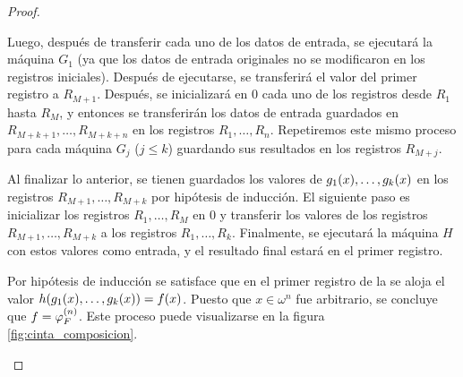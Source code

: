 \begin{proof}
\begin{itemize}
\begin{itemize}
	Luego, después de transferir cada uno de los datos de entrada, se ejecutará la máquina $G_{1}$ (ya que los datos de entrada originales no se modificaron en los registros iniciales). Después de ejecutarse, se transferirá el valor del primer registro a $R_{M + 1}$.
	Después, se inicializará en $0$ cada uno de los registros desde $R_{1}$ hasta $R_{M}$, y entonces se transferirán los datos de entrada guardados en $R_{M + k + 1},\dotsc, R_{M + k + n}$ en los registros $R_{1},\dotsc, R_{n}$. Repetiremos este mismo proceso para cada máquina $G_{j}$ ($j\leq k$) guardando sus resultados en los registros $R_{M + j}$.

	Al finalizar lo anterior, se tienen guardados los valores de $g_{1}\pa*{x},\dotsc, g_{k}\pa*{x}$ en los registros $R_{M + 1},\dotsc, R_{M + k}$ por hipótesis de inducción. El siguiente paso es inicializar los registros $R_{1},\dotsc, R_{M}$ en $0$ y transferir los valores de los registros $R_{M + 1},\dotsc, R_{M + k}$ a los registros $R_{1},\dotsc, R_{k}$. Finalmente, se ejecutará la máquina $H$ con estos valores como entrada, y el resultado final estará en el primer registro.

	Por hipótesis de inducción se satisface que en el primer registro de la se aloja el valor $h\pa*{g_{1}\pa*{x},\dotsc, g_{k}\pa*{x}} = f\pa*{x}$. Puesto que $x\in\omega^{n}$ fue arbitrario, se concluye que $f =\PHI{F}[n]$. Este proceso puede visualizarse en la figura \ref{fig:cinta_composicion}.

	\begin{figure}[h!]
		\centering
		\newcommand{\celda}[5]{%
			\fill[#4] (#1, #3) rectangle (#2, #3 + 0.8);
			\draw[thick] (#1, #3) rectangle (#2, #3 + 0.8);
			\node at ({(#1 + #2)/2}, #3 + 0.4) {#5};
		}
		\newcommand{\etapa}[2]{%
			\node[anchor = east, text width = 3.4cm, align = right] at (-0.3, #1 + 0.4) {\scriptsize #2};
		}
		\newcommand{\HL}{violet!50!blue!10}


\end{figure}
\end{itemize}
\end{itemize}
\end{proof}
